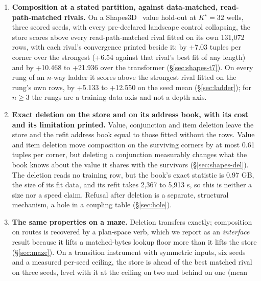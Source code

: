 \documentclass{article} %
\newcommand{\Kstar}{\ensuremath{K^{\star}}}
\begin{document}
\begin{enumerate}[leftmargin=*,itemsep=2pt]
\item \textbf{Composition at a stated partition, against data-matched, read-path-matched rivals.} On a
  Shapes3D~\citep{burgess2018shapes,kim2018disentangling} value hold-out at $\Kstar=32$ wells, three scored seeds, with every %
  pre-declared landscape control collapsing, the store scores above every read-path-matched rival
  fitted on its own 131,072 rows, with each rival's convergence printed beside it: by +7.03 tuples %
  per corner over the strongest (+6.54 against that rival's best fit of any length) and by +10.468 %
  to +21.936 over the transformer (\S\ref{sec:shapes-t7}). On every rung of an $n$-way ladder it %
  scores above the strongest rival fitted on the rung's own rows, by +5.133 to +12.550 on the seed %
  mean (\S\ref{sec:ladder}); for $n\ge3$ the rungs are a training-data axis and not a depth axis.
\item \textbf{Exact deletion on the store and on its address book, with its cost and its limitation
  printed.} Value, conjunction and item deletion leave the store and the refit address book equal to
  those fitted without the rows. Value and item deletion move composition on the surviving corners by
  at most 0.61 tuples per corner, but deleting a conjunction measurably changes what the book knows %
  about the value it shares with the survivors (\S\ref{sec:shapes-del}). The deletion reads no
  training row, but the book's exact statistic is 0.97 GB, the size of its fit data, and its refit %
  takes 2,367 to 5,913 s, so this is neither a size nor a speed claim. Refusal after deletion is a %
  separate, structural mechanism, a hole in a coupling table (\S\ref{sec:hole}).
\item \textbf{The same properties on a maze.} Deletion transfers exactly; composition on routes is
  recovered by a plan-space verb, which we report as an \emph{interface} result because it lifts a
  matched-bytes lookup floor more than it lifts the store (\S\ref{sec:maze}). On a transition
  instrument with symmetric inputs, six seeds and a measured per-seed ceiling, the store is ahead of
  the best matched rival on three seeds, level with it at the ceiling on two and behind on one (mean

\end{enumerate}
\end{document}
